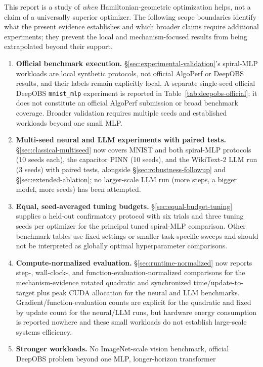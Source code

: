 \documentclass[10pt,twocolumn]{article}
\begin{document}
This report is a study of \emph{when} Hamiltonian-geometric optimization
helps, not a claim of a universally superior optimizer. The following scope
boundaries identify what the present evidence establishes and which broader
claims require additional experiments; they prevent the local and
mechanism-focused results from being extrapolated beyond their support.

\begin{enumerate}
\item \textbf{Official benchmark execution.} \S\ref{sec:experimental-validation}'s
spiral-MLP workloads are local synthetic protocols, not official AlgoPerf or
DeepOBS results, and their labels remain explicitly local. A separate
single-seed official DeepOBS \texttt{mnist\_mlp} experiment is reported in
Table~\ref{tab:deepobs-official}; it does not constitute an official AlgoPerf
submission or broad benchmark coverage. Broader validation requires multiple
seeds and established workloads beyond one small MLP.
\item \textbf{Multi-seed neural and LLM experiments with paired tests.}
\S\ref{sec:classical-multiseed} now covers MNIST and both spiral-MLP protocols
(10 seeds each), the capacitor PINN (10 seeds), and the WikiText-2 LLM run
(3 seeds) with paired
tests, alongside \S\ref{sec:robustness-followup} and
\S\ref{sec:extended-ablation}; no larger-scale LLM run (more steps, a bigger
model, more seeds) has been attempted.
\item \textbf{Equal, seed-averaged tuning budgets.}
\S\ref{sec:equal-budget-tuning} supplies a held-out confirmatory protocol
with six trials and three tuning seeds per optimizer for the principal tuned
spiral-MLP comparison. Other benchmark tables use fixed settings or smaller
task-specific sweeps and should not be interpreted as globally optimal
hyperparameter comparisons.
\item \textbf{Compute-normalized evaluation.} \S\ref{sec:runtime-normalized}
now reports step-, wall-clock-, and function-evaluation-normalized
comparisons for the mechanism-evidence rotated quadratic and synchronized
time/update-to-target plus peak CUDA allocation for the neural and LLM
benchmarks. Gradient/function-evaluation counts are explicit for the
quadratic and fixed by update count for the neural/LLM runs, but hardware
energy consumption is reported nowhere and these small workloads do not
establish large-scale systems efficiency.
\item \textbf{Stronger workloads.} No ImageNet-scale vision benchmark,
official DeepOBS problem beyond one MLP, longer-horizon transformer

\end{enumerate}
\end{document}
